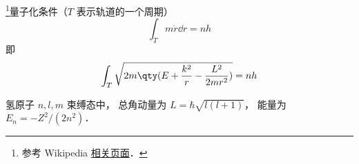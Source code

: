 
\begin{issues}
\issueDraft
\end{issues}

\footnote{参考 Wikipedia \href{https://en.wikipedia.org/wiki/Bohr_model}{相关页面}．}量子化条件（$T$ 表示轨道的一个周期）
\begin{equation}
\int_T m\dot r \dd{r} = nh
\end{equation}
即
\begin{equation}
\int_T \sqrt{2m\qty(E + \frac{k^2}{r} - \frac{L^2}{2mr^2})} = nh
\end{equation}


氢原子 $n,l,m$ 束缚态中， 总角动量为 $L = \hbar\sqrt{l(l+1)}$， 能量为 $E_n = -Z^2/(2n^2)$．
